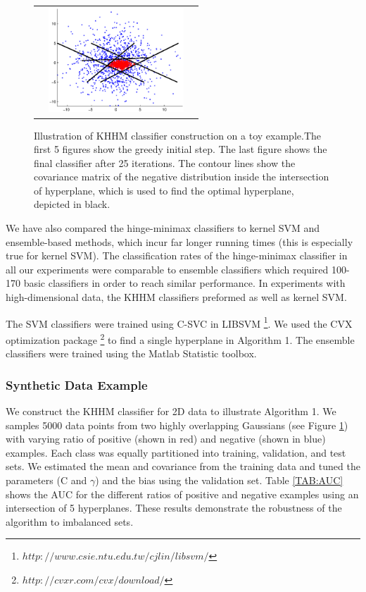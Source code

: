 \documentclass[twoside,11pt]{article}
\begin{document}
\begin{figure}
\begin{tabular}{ccc}
& \includegraphics[width=2in]{ex_5_final.eps}
\end{tabular}
\caption {Illustration of KHHM classifier construction on a toy example.The first 5 figures show the greedy initial step. The last figure shows the final classifier after 25 iterations. The contour lines show the covariance matrix of the negative distribution inside the intersection of hyperplane, which is used to find the optimal hyperplane, depicted in black.}
\label{fig_toy_ex}
\end{figure}
We have also compared the hinge-minimax classifiers to kernel SVM and
ensemble-based methods, which incur far longer running
times (this is especially true for kernel SVM). The classification rates of the hinge-minimax classifier in all our experiments were comparable to ensemble classifiers which required 100-170 basic classifiers in order to reach similar performance. In experiments with high-dimensional data, the KHHM  classifiers preformed as well as kernel SVM.

The SVM classifiers were trained using C-SVC
in LIBSVM \footnote{$http://www.csie.ntu.edu.tw/
cjlin/libsvm/$}. We used the CVX optimization package
\footnote{$http://cvxr.com/cvx/download/$} to find a single hyperplane in Algorithm 1. The ensemble classifiers were trained using the
Matlab Statistic toolbox.

\subsubsection{Synthetic Data Example}
We construct the KHHM classifier for  2D data to illustrate Algorithm 1. We samples 5000 data points from two highly overlapping Gaussians (see Figure \ref{fig_toy_ex}) with varying ratio of positive (shown in red) and negative (shown in blue) examples. Each class was equally partitioned into training, validation, and test sets. We estimated the mean and covariance from the training data and tuned the parameters (C and $\gamma$) and the bias using the validation set. Table \ref{TAB:AUC} shows the AUC for the different ratios of positive and negative examples using an intersection of 5 hyperplanes. These results demonstrate the robustness of the algorithm to imbalanced sets.
\end{document}
